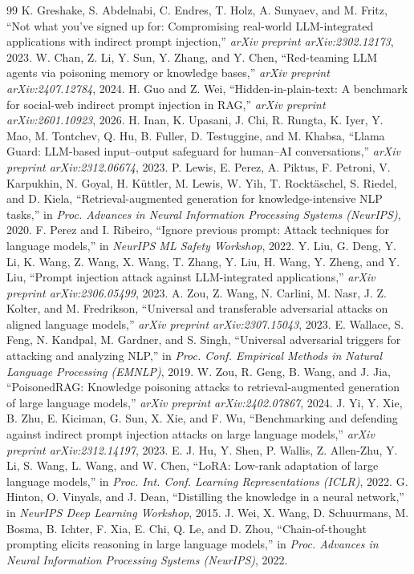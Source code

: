 \documentclass[11pt]{article}
\begin{document}
\begin{thebibliography}{99}
 K. Greshake, S. Abdelnabi, C. Endres, T. Holz, A. Sunyaev, and
M. Fritz, ``Not what you've signed up for: Compromising real-world LLM-integrated
applications with indirect prompt injection,'' \emph{arXiv preprint arXiv:2302.12173},
2023.
 W. Chan, Z. Li, Y. Sun, Y. Zhang, and Y. Chen, ``Red-teaming
LLM agents via poisoning memory or knowledge bases,'' \emph{arXiv preprint
arXiv:2407.12784}, 2024.
 H. Guo and Z. Wei, ``Hidden-in-plain-text: A benchmark for social-web
indirect prompt injection in RAG,'' \emph{arXiv preprint arXiv:2601.10923}, 2026.
 H. Inan, K. Upasani, J. Chi, R. Rungta, K. Iyer, Y. Mao,
M. Tontchev, Q. Hu, B. Fuller, D. Testuggine, and M. Khabsa, ``Llama Guard: LLM-based
input--output safeguard for human--AI conversations,'' \emph{arXiv preprint
arXiv:2312.06674}, 2023.
 P. Lewis, E. Perez, A. Piktus, F. Petroni, V. Karpukhin, N. Goyal,
H. K\"uttler, M. Lewis, W. Yih, T. Rockt\"aschel, S. Riedel, and D. Kiela,
``Retrieval-augmented generation for knowledge-intensive NLP tasks,'' in
\emph{Proc. Advances in Neural Information Processing Systems (NeurIPS)}, 2020.
 F. Perez and I. Ribeiro, ``Ignore previous prompt: Attack techniques
for language models,'' in \emph{NeurIPS ML Safety Workshop}, 2022.
 Y. Liu, G. Deng, Y. Li, K. Wang, Z. Wang, X. Wang, T. Zhang, Y. Liu,
H. Wang, Y. Zheng, and Y. Liu, ``Prompt injection attack against LLM-integrated
applications,'' \emph{arXiv preprint arXiv:2306.05499}, 2023.
 A. Zou, Z. Wang, N. Carlini, M. Nasr, J. Z. Kolter, and M. Fredrikson,
``Universal and transferable adversarial attacks on aligned language models,''
\emph{arXiv preprint arXiv:2307.15043}, 2023.
 E. Wallace, S. Feng, N. Kandpal, M. Gardner, and S. Singh,
``Universal adversarial triggers for attacking and analyzing NLP,'' in \emph{Proc.
Conf. Empirical Methods in Natural Language Processing (EMNLP)}, 2019.
 W. Zou, R. Geng, B. Wang, and J. Jia, ``PoisonedRAG: Knowledge
poisoning attacks to retrieval-augmented generation of large language models,''
\emph{arXiv preprint arXiv:2402.07867}, 2024.
 J. Yi, Y. Xie, B. Zhu, E. Kiciman, G. Sun, X. Xie, and F. Wu,
``Benchmarking and defending against indirect prompt injection attacks on large
language models,'' \emph{arXiv preprint arXiv:2312.14197}, 2023.
 E. J. Hu, Y. Shen, P. Wallis, Z. Allen-Zhu, Y. Li, S. Wang, L. Wang,
and W. Chen, ``LoRA: Low-rank adaptation of large language models,'' in \emph{Proc.
Int. Conf. Learning Representations (ICLR)}, 2022.
 G. Hinton, O. Vinyals, and J. Dean, ``Distilling the knowledge in a
neural network,'' in \emph{NeurIPS Deep Learning Workshop}, 2015.
 J. Wei, X. Wang, D. Schuurmans, M. Bosma, B. Ichter, F. Xia, E. Chi,
Q. Le, and D. Zhou, ``Chain-of-thought prompting elicits reasoning in large language
models,'' in \emph{Proc. Advances in Neural Information Processing Systems (NeurIPS)},
2022.
\end{thebibliography}
\end{document}
